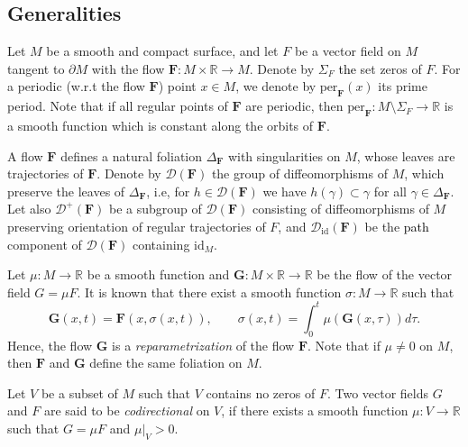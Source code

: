 \documentclass[10pt,reqno]{amsart}
\newcommand{\bbR}{\mathbb{R}}
\newcommand{\bfF}{\mathbf{F}}
\newcommand{\id}{\mathrm{id}}
\newcommand{\textr}[1]{\textcolor{black}{#1}}
\begin{document}
\subsection{Generalities}\label{ssec:generalit-flow}
Let $M$ be a smooth and compact surface, and let $F$ be a vector field on $M$ tangent to $\partial M$ with the flow $\mathbf{F}:M\times\bbR\to M$. Denote by $\Sigma_F$  \textr{the} set zeros of $F$. For a periodic (w.r.t the flow $\bfF$) point $x\in M$, we denote by $\mathrm{per}_{\bfF}(x)$ its prime period. Note that if all regular points of $\bfF$ are periodic, then
  $\mathrm{per}_{\bfF}:M\setminus \Sigma_F\to \bbR$ is a smooth function which is constant along the orbits of $\bfF$.
  
A flow $\bfF$ defines a natural  foliation $\Delta_{\bfF}$ with singularities on $M$, whose leaves are trajectories of $\bfF.$  Denote by $\mathcal{D}(\bfF)$  the group of diffeomorphisms of $M$, which preserve the leaves of $\Delta_{\bfF}$, i.e, for $h\in \mathcal{D}(\bfF)$ we have $h(\gamma)\subset \gamma$ for all $\gamma\in \Delta_{\bfF}$. Let also $\mathcal{D}^+(\bfF)$ be a subgroup of $\mathcal{D}(\bfF)$ consisting of   diffeomorphisms of $M$  preserving  orientation of regular trajectories of $F$, and $\mathcal{D}_{\id}(\bfF)$ be the \textr{path} component of $\mathcal{D}(\bfF)$ containing  $\id_M$.




Let $\mu:M\to \bbR$ be a smooth function and $\mathbf{G}:M\times \bbR\to \bbR$ be the flow of the vector field $G = \mu F.$ It is known \cite[Lemma 2.1]{Maks:reparam-sh-map} that there exist a smooth function $\sigma:M\to \bbR$ such that 
\begin{equation}\label{eq:repar-flow}
\mathbf{G}(x,t) = \mathbf{F}(x,\sigma(x,t)), \qquad \sigma(x,t)  = \int_0^t\mu(\mathbf{G}(x,\tau))d\tau.
\end{equation}
Hence, the flow $\mathbf{G}$ is a {\it reparametrization} of the flow $\bfF$.  
Note that if $\mu\neq 0$ on $M$, then $\bfF$ and $\mathbf{G}$ define the same foliation on $M$.

Let $V$ be a subset of $M$ such that $V$ contains no zeros of $F$. {Two vector fields $G$ and $F$ are said to be {\it codirectional} on $V$, if there exists a smooth function $\mu:V\to \bbR$ such that  $G = \mu F$ and $\mu|_V>0$.}




 
\end{document}
